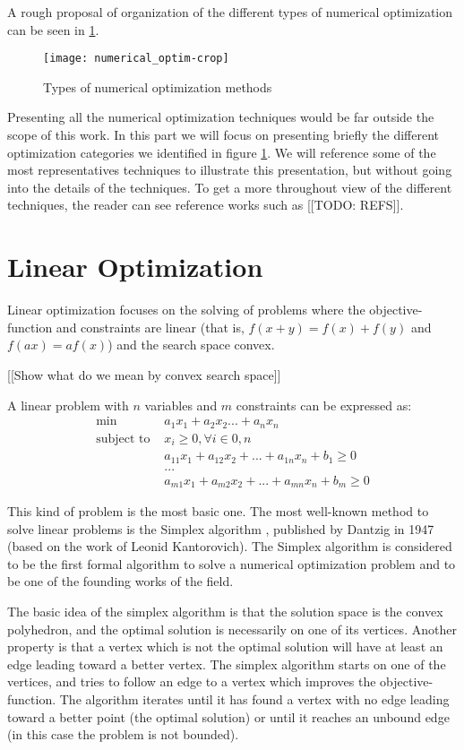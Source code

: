 A rough proposal of organization of the different types of numerical optimization can be seen in \ref{numerical_optim_tree}.

\begin{figure}
\texttt{[image: numerical\_optim-crop]}
\caption{Types of numerical optimization methods}
\label{numerical_optim_tree}
\end{figure}

Presenting all the numerical optimization techniques would be far outside the scope of this work. In this part we will focus on presenting briefly the different optimization categories we identified in figure \ref{numerical_optim_tree}. We will reference some of the most representatives techniques to illustrate this presentation, but without going into the details of the techniques. To get a more throughout view of the different techniques, the reader can see reference works such as [[TODO: REFS]].

\section{Linear Optimization}\label{linear_optim}

Linear optimization focuses on the solving of problems where the objective-function and constraints are linear (that is, $f(x+y) = f(x)+f(y)$ and $f(ax) = af(x)$) and the search space convex.

[[Show what do we mean by convex search space]]

A linear problem with $n$ variables and $m$ constraints can be expressed as:
\begin{align*}
\text{min } & a_1x_1 + a_2x_2... + a_nx_n\\
\text{subject to } &x_i \geq 0, \forall i \in 0,n\\
&a_{11}x_1 + a_{12}x_2 + ... + a_{1n}x_n + b_1 \geq 0\\
&...\\
&a_{m1}x_1 + a_{m2}x_2 + ... + a_{mn}x_n + b_m \geq 0
\end{align*}

This kind of problem is the most basic one. The most well-known method to solve linear problems is the Simplex algorithm \cite{dantzig1998linear}, published by Dantzig in 1947 (based on the work of Leonid Kantorovich). The Simplex algorithm is considered to be the first formal algorithm to solve a numerical optimization problem and to be one of the founding works of the field.

The basic idea of the simplex algorithm is that the solution space is the convex polyhedron, and the optimal solution is necessarily on one of its vertices. Another property is that a vertex which is not the optimal solution will have at least an edge leading toward a better vertex.
The simplex algorithm starts on one of the vertices, and tries to follow an edge to a vertex which improves the objective-function. The algorithm iterates until it has found a vertex with no edge leading toward a better point (the optimal solution) or until it reaches an unbound edge (in this case the problem is not bounded).

